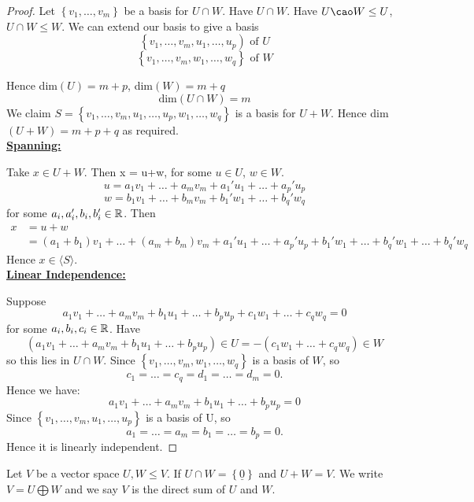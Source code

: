 \begin{proof}
	Let $\left\{ v_1,\ldots,v_m \right\}$ be a basis for $U \cap W$. Have $U \cap W$. Have $U \cao W \le  U$, $U \cap W \le W$. We can extend our basis to give a basis
	\[
		\left\{ v_1,\ldots,v_m,u_1,\ldots,u_p \right) \text{ of } U
	\] \[
	\left\{ v_1,\ldots,v_m,w_1,\ldots,w_q \right\} \text{ of } W
	\]

	Hence dim$\left( U \right) = m+p$, dim$\left( W \right) = m+q$
	\[
	\text{dim}\left( U \cap W \right) =m
	\]
	We claim $S = \left\{ v_1,\ldots,v_m,u_1,\ldots,u_p,w_1,\ldots,w_q \right\}$ is a basis for $U + W$. Hence dim$\left( U+W \right) =m+p+q$ as required.
\[ \] 
\noindent \underline{\textbf{Spanning:}}

\noindent Take $x \in U+W$. Then x = u+w, for some $u \in U$, $w \in W$.
\[
u = a_1 v_1 + \ldots +a_m v_m +a_1' u_1 +\ldots+ a_p' u_p
\]\[
w = b_1 v_1 + \ldots + b_m v_m +b_1' w_1 +\ldots+ b_q' w_q
\] for some $a_i,a_i', b_i,b_i' \in \mathbb{R}$. Then 
\begin{align*}
	x &= u+w \\
	  &= \left( a_1 +b_1 \right) v_1+\ldots+\left( a_m + b_m \right) v_m + a_1' u_1 +\ldots +a_p' u_p +b_1' w_1 +\ldots+ b_q ' w_1 +\ldots+ b_q' w_q
\end{align*} 
Hence $x \in \langle S \rangle$.
\[ \] 
\noindent \underline{\textbf{Linear Independence:}}

\noindent Suppose
\[
a_1 v_1 + \ldots +a_m v_m+ b_1 u_1 +\ldots + b_p u_p + c_1 w_1 + \ldots + c_q w_q = 0
\] for some $a_i,b_i,c_i \in  \mathbb{R}$. Have
\[
	\left( a_1 v_1 +\ldots+a_m v_m + b_1 u_1 +\ldots +b_p u_p \right) \in U = - \left( c_1 w_1 +\ldots+ c_q w_q \right) \in W
\] so this lies in $U \cap W$. Since $\left\{ v_1,\ldots,v_m,w_1,\ldots,w_q \right\}$ is a basis of $W$, so
\[
c_1=\ldots=c_q=d_1=\ldots=d_m=0
.\] Hence we have:
\[
a_1 v_1 +\ldots+ a_m v_m +b_1 u_1 +\ldots+b_p u_p = 0
\] Since $\left\{ v_1,\ldots,v_m,u_1,\ldots,u_p \right\} $ is a basis of U, so
\[
a_1 = \ldots=a_m =b_1=\ldots=b_p =0
.\] Hence it is linearly independent.
\end{proof}

\begin{definition}
	Let $V$ be a vector space $U,W \le V$. If $U \cap W = \left\{ \underline{0} \right\} $ and $U+W=V$. We write $V = U \bigoplus W$ and we say $V$ is the direct sum of $U$ and $W$.
\end{definition}



